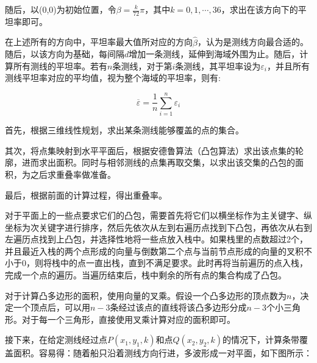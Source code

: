 随后，以(0,0)为初始位置，令$\beta = \frac{k}{72}\pi$，其中$k = 0, 1, \cdots, 36$，求出在该方向下的平坦率即可。



在上述所有的方向中，平坦率最大值所对应的方向$\hat \beta$，认为是测线方向最合适的。随后，以该方向为基础，每间隔$d$增加一条测线，延伸到海域外围为止。随后，计算所有测线的平坦率。若有$n$条测线，对于第$i$条测线，其平坦率设为$\varepsilon_i$，并且所有测线平坦率对应的平均值，视为整个海域的平坦率，则有:

\begin{equation}
    \overline{\varepsilon} = \frac{1}{n} \sum^{n}_{i=1}\varepsilon_i
\end{equation}


首先，根据三维线性规划，求出某条测线能够覆盖的点的集合。

其次，将点集映射到水平平面后，根据安德鲁算法（凸包算法）求出该点集的轮廓，进而求出面积。同时与相邻测线的点集再取交集，以求出该交集的凸包的面积，为之后求重叠率做准备。

最后，根据前面的计算过程，得出重叠率。

对于平面上的一些点要求它们的凸包，需要首先将它们以横坐标作为主关键字、纵坐标为次关键字进行排序，然后先依次从左到右遍历点找到下凸包，再依次从右到左遍历点找到上凸包，并选择性地将一些点放入栈中。如果栈里的点数超过2个，并且最近入栈的两个点形成的向量与倒数第二个点与当前节点形成的向量的叉积不小于0，则将栈中的点一直出栈，直到不满足要求。此时再将当前遍历的点入栈，完成一个点的遍历。当遍历结束后，栈中剩余的所有点的集合构成了凸包。

对于计算凸多边形的面积，使用向量的叉乘。假设一个凸多边形的顶点数为$n$，决定一个顶点后，可以用$n-3$条经过该点的直线将该凸多边形分成$n-3$个小三角形。对于每一个三角形，直接使用叉乘计算对应的面积即可。

接下来，在给定测线经过点$P(x_1, y_1, k)$和点$Q(x_2, y_2, k)$的情况下，计算条带覆盖面积。容易得：随着船只沿着测线方向行进，多波形成一对平面，如下图所示：

